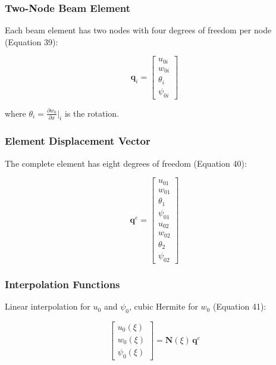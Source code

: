 \documentclass[12pt,a4paper]{article}
\begin{document}
\subsubsection{Two-Node Beam Element}

Each beam element has two nodes with four degrees of freedom per node (Equation 39):

\begin{equation}
    \mathbf{q}_i = \begin{bmatrix} u_{0i} \\ w_{0i} \\ \theta_i \\ \psi_{0i} \end{bmatrix}
\end{equation}

where $\theta_i = \frac{\partial w_0}{\partial x}|_i$ is the rotation.

\subsubsection{Element Displacement Vector}

The complete element has eight degrees of freedom (Equation 40):

\begin{equation}
    \mathbf{q}^e = \begin{bmatrix} u_{01} \\ w_{01} \\ \theta_1 \\ \psi_{01} \\ u_{02} \\ w_{02} \\ \theta_2 \\ \psi_{02} \end{bmatrix}
\end{equation}

\subsubsection{Interpolation Functions}

Linear interpolation for $u_0$ and $\psi_0$, cubic Hermite for $w_0$ (Equation 41):

\begin{equation}
   \begin{bmatrix} u_0(\xi) \\ w_0(\xi) \\ \psi_0(\xi) \end{bmatrix}
= \mathbf{N}(\xi) \, \mathbf{q}^e
\end{equation}
\end{document}
